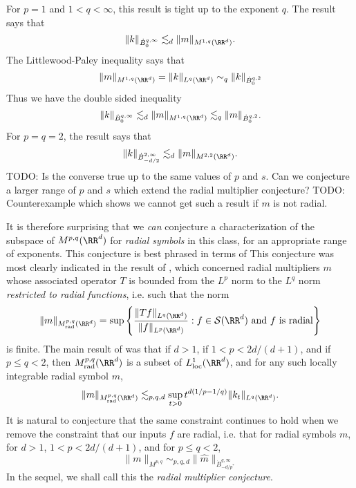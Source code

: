 For $p = 1$ and $1 < q < \infty$, this result is tight up to the exponent $q$. The result says that
%
\[ \| k \|_{\dot{B}^{q,\infty}_0} \lesssim_d \| m \|_{M^{1,q}(\RR^d)}. \]
%
The Littlewood-Paley inequality says that
%
\[ \| m \|_{M^{1,q}(\RR^d)} = \| k \|_{L^q(\RR^d)} \sim_q \| k \|_{\dot{B}^{q,2}_0} \]
%
Thus we have the double sided inequality
%
\[ \| k \|_{\dot{B}^{q,\infty}_0} \lesssim_d \| m \|_{M^{1,q}(\RR^d)} \lesssim_q \| m \|_{\dot{B}^{q,2}_0}. \]
%
For $p = q = 2$, the result says that
%
\[ \| k \|_{\dot{B}^{2,\infty}_{-d/2}} \lesssim_d \| m \|_{M^{2,2}(\RR^d)}. \]
%
TODO: Is the converse true up to the same values of $p$ and $s$. Can we conjecture a larger range of $p$ and $s$ which extend the radial multiplier conjecture? TODO: Counterexample which shows we cannot get such a result if $m$ is not radial.

It is therefore surprising that we \emph{can} conjecture a characterization of the subspace of $M^{p,q}(\RR^d)$ for \emph{radial symbols} in this class, for an appropriate range of exponents. This conjecture is best phrased in terms of  This conjecture was most clearly indicated in the result of \cite{GarrigosandSeeger}, which concerned radial multipliers $m$ whose associated operator $T$ is bounded from the $L^p$ norm to the $L^q$ norm \emph{restricted to radial functions}, i.e. such that the norm
%
\[ \| m \|_{M^{p,q}_{\text{rad}}(\RR^d)} = \sup \left\{ \frac{\| Tf \|_{L^q(\RR^d)}}{\| f \|_{L^p(\RR^d)}} : f \in \mathcal{S}(\RR^d)\ \text{and $f$ is radial} \right\} \]
%
is finite. The main result of \cite{GarrigosandSeeger} was that if $d > 1$, if $1 < p < 2d/(d+1)$, and if $p \leq q < 2$, then $M^{p,q}_{\text{rad}}(\RR^d)$ is a subset of $L^1_{\text{loc}}(\RR^d)$, and for any such locally integrable radial symbol $m$,
%
\[ \| m \|_{M^{p,q}_{\text{rad}}(\RR^d)} \lesssim_{p,q,d} \sup_{t > 0} t^{d(1/p - 1/q)} \| k_t \|_{L^q(\RR^d)}. \]
%
It is natural to conjecture that the same constraint continues to hold when we remove the constraint that our inputs $f$ are radial, i.e. that for radial symbols $m$, for $d > 1$, $1 < p < 2d/(d+1)$, and for $p \leq q < 2$,
%
\[ \| m \|_{M^{p,q}} \sim_{p,q,d} \| \widehat{m} \|_{\dot{B}_{-d/p^*}^{q,\infty}} \]
%
In the sequel, we shall call this the \emph{radial multiplier conjecture}.


